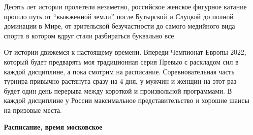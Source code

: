 Десять лет истории пролетели незаметно, российское женское фигурное катание
прошло путь от \enquote{выжженной земли} после Бутырской и Слуцкой до полной доминации
в Мире, от зрительской безучастности до самого медийного вида спорта в котором
вдруг стали разбираться буквально все.

От истории движемся к настоящему времени. Впереди Чемпионат Европы 2022,
который будет предварять моя традиционная серия Превью с раскладом сил в каждой
дисциплине, а пока смотрим на расписание. Соревновательная часть турнира
привычно растянута сразу на 4 дня, у мужчин и женщин на этот раз будет один
день перерыва между короткой и произвольной программами. В каждой дисциплине у
России максимальное представительство и хорошие шансы на призовые места.

\textbf{Расписание, время московское}

